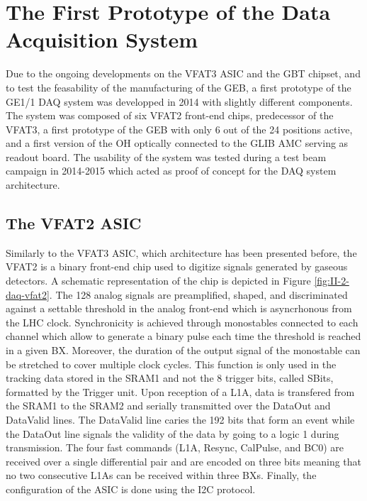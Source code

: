   \section{The First Prototype of the Data Acquisition System}

    Due to the ongoing developments on the VFAT3 ASIC and the GBT chipset, and to test the feasability of the manufacturing of the GEB, a first prototype of the GE1/1 DAQ system was developped in 2014 with slightly different components. The system was composed of six VFAT2 front-end chips, predecessor of the VFAT3, a first prototype of the GEB with only 6 out of the 24 positions active, and a first version of the OH optically connected to the GLIB AMC serving as readout board. The usability of the system was tested during a test beam campaign in 2014-2015 which acted as proof of concept for the DAQ system architecture.

    \subsection{The VFAT2 ASIC}

      Similarly to the VFAT3 ASIC, which architecture has been presented before, the VFAT2 is a binary front-end chip used to digitize signals generated by gaseous detectors. A schematic representation of the chip is depicted in Figure \ref{fig:II-2-daq-vfat2}. The 128 analog signals are preamplified, shaped, and discriminated against a settable threshold in the analog front-end which is asyncrhonous from the LHC clock. Synchronicity is achieved through monostables connected to each channel which allow to generate a binary pulse each time the threshold is reached in a given BX. Moreover, the duration of the output signal of the monostable can be stretched to cover multiple clock cycles. This function is only used in the tracking data stored in the SRAM1 and not the 8 trigger bits, called SBits, formatted by the Trigger unit. Upon reception of a L1A, data is transfered from the SRAM1 to the SRAM2 and serially transmitted over the DataOut and DataValid lines. The DataValid line caries the 192 bits that form an event while the DataOut line signals the validity of the data by going to a logic 1 during transmission. The four fast commands (L1A, Resync, CalPulse, and BC0) are received over a single differential pair and are encoded on three bits meaning that no two consecutive L1As can be received within three BXs. Finally, the configuration of the ASIC is done using the I2C protocol. \\

